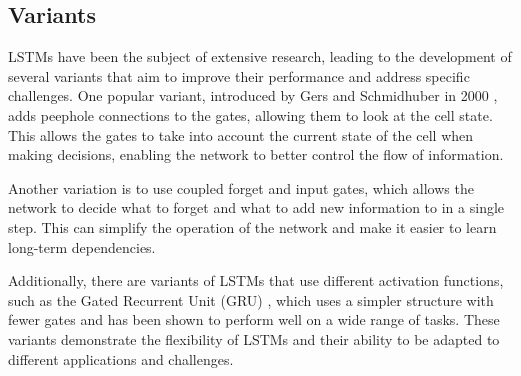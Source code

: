 \documentclass{article}
\begin{document}
\subsection{Variants}
\label{sec:3.1}

LSTMs have been the subject of extensive research, leading to the development of several
variants that aim to improve their performance and address specific challenges. One
popular variant, introduced by Gers and Schmidhuber in 2000
\cite{gersLearningForgetContinual2000}, adds peephole connections to the gates, allowing
them to look at the cell state. This allows the gates to take into account the current
state of the cell when making decisions, enabling the network to better control the flow
of information.

Another variation is to use coupled forget and input gates, which allows the network to
decide what to forget and what to add new information to in a single step. This can
simplify the operation of the network and make it easier to learn long-term dependencies.

Additionally, there are variants of LSTMs that use different activation functions, such as
the Gated Recurrent Unit (GRU) \cite{choLearningPhraseRepresentations2014}, which uses a
simpler structure with fewer gates and has been shown to perform well on a wide range of
tasks. These variants demonstrate the flexibility of LSTMs and their ability to be adapted
to different applications and challenges.









\end{document}
